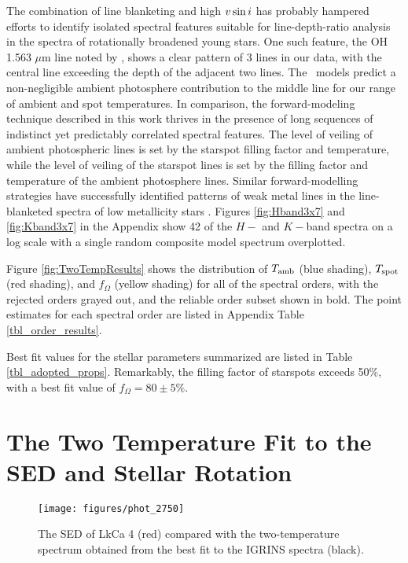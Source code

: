 \documentclass[twocolumn]{emulateapj}%
\begin{document}
The combination of line blanketing and high $v \sin i$ has probably hampered efforts to identify isolated spectral features suitable for line-depth-ratio analysis in the spectra of rotationally broadened young stars.  One such feature, the OH 1.563 $\mu$m line noted by \citet{oneal01}, shows a clear pattern of 3 lines in our data, with the central line exceeding the depth of the adjacent two lines.  The \PHOENIX\ models predict a non-negligible ambient photosphere contribution to the middle line for our range of ambient and spot temperatures.  In comparison, the forward-modeling technique described in this work thrives in the presence of long sequences of indistinct yet predictably correlated spectral features.  The level of veiling of ambient photospheric lines is set by the starspot filling factor and temperature, while the level of veiling of the starspot lines is set by the filling factor and temperature of the ambient photosphere lines. Similar forward-modelling strategies have successfully identified patterns of weak metal lines in the line-blanketed spectra of low metallicity stars \citep{kirby11,kirby15}.  Figures \ref{fig:Hband3x7} and \ref{fig:Kband3x7} in the Appendix show 42 of the $H-$ and $K-$band spectra on a log scale with a single random composite model spectrum overplotted.  

Figure \ref{fig:TwoTempResults} shows the distribution of $T_\textrm{amb}$ (blue shading), $T_\textrm{spot}$ (red shading), and $f_{\Omega}$ (yellow shading) for all of the spectral orders, with the rejected orders grayed out, and the reliable order subset shown in bold.  The point estimates for each spectral order are listed in Appendix Table \ref{tbl_order_results}.

Best fit values for the stellar parameters summarized are listed in Table \ref{tbl_adopted_props}.  Remarkably, the filling factor of starspots exceeds 50\%, with a best fit value of $f_{\Omega}=80\pm 5 \% $.




\section{The Two Temperature Fit to the SED and Stellar Rotation}\label{sec:GJHsection4}

\begin{figure}
 \centering
 \texttt{[image: figures/phot\_2750]}
\caption{The SED of LkCa 4 (red) compared with the two-temperature spectrum obtained from the best fit to the IGRINS spectra (black).}
\label{fig:sed}
\end{figure}
\end{document}
